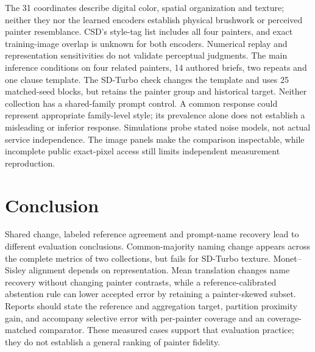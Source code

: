 The 31 coordinates describe digital color, spatial organization and texture;
neither they nor the learned encoders establish physical brushwork or perceived
painter resemblance. CSD's style-tag list includes all four painters, and exact
training-image overlap is unknown for both encoders. Numerical replay and
representation sensitivities do not validate perceptual judgments.
The main inference conditions on four related painters, 14 authored briefs,
two repeats and one clause template. The SD-Turbo check changes the template
and uses 25 matched-seed blocks, but retains the painter group and historical
target. Neither collection has a shared-family prompt control. A common response
could represent appropriate family-level style; its prevalence alone does not
establish a misleading or inferior response. Simulations probe stated noise
models, not actual service independence. The image panels
make the comparison inspectable, while incomplete public exact-pixel access
still limits independent measurement reproduction.

\section{Conclusion}
Shared change, labeled reference agreement and prompt-name recovery lead to
different evaluation conclusions. Common-majority naming change appears across
the complete metrics of two collections, but fails for SD-Turbo texture.
Monet--Sisley alignment depends on representation. Mean translation changes
name recovery without changing painter contrasts, while a reference-calibrated
abstention rule can lower accepted error by retaining a painter-skewed subset.
Reports should state the reference and aggregation target, partition proximity
gain, and accompany selective error with per-painter coverage and an
coverage-matched comparator. These measured cases support that evaluation
practice; they do not establish a general ranking of painter fidelity.
